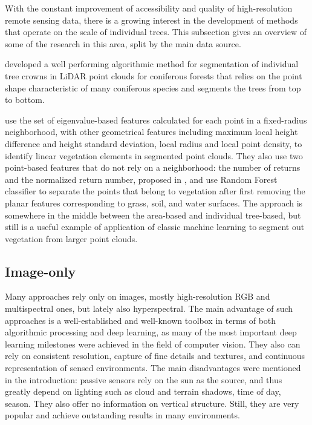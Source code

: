 With the constant improvement of accessibility and quality of high-resolution remote sensing data, there is a growing interest in the development of methods that operate on the scale of individual trees.
This subsection gives an overview of some of the research in this area, split by the main data source.

\citet{liNewMethodSegmenting2012} developed a well performing algorithmic method for segmentation of individual tree crowns in LiDAR point clouds for coniferous forests that relies on the point shape characteristic of many coniferous species and segments the trees from top to bottom.

\citet{lucasIdentificationLinearVegetation2019} use the set of eigenvalue-based features calculated for each point in a fixed-radius neighborhood, with other geometrical features including maximum local height difference and height standard deviation, local radius and local point density, to identify linear vegetation elements in segmented point clouds.
They also use two point-based features that do not rely on a neighborhood: the number of returns and the normalized return number, proposed in \citet{guoRelevanceAirborneLidar2011}, and use Random Forest classifier to separate the points that belong to vegetation after first removing the planar features corresponding to grass, soil, and water surfaces.
The approach is somewhere in the middle between the area-based and individual tree-based, but still is a useful example of application of classic machine learning to segment out vegetation from larger point clouds.

\subsection{Image-only}

Many approaches rely only on images, mostly high-resolution RGB and multispectral ones, but lately also hyperspectral.
The main advantage of such approaches is a well-established and well-known toolbox in terms of both algorithmic processing and deep learning, as many of the most important deep learning milestones were achieved in the field of computer vision.
They also can rely on consistent resolution, capture of fine details and textures, and continuous representation of sensed environments.
The main disadvantages were mentioned in the introduction: passive sensors rely on the sun as the source, and thus greatly depend on lighting such as cloud and terrain shadows, time of day, season.
They also offer no information on vertical structure.
Still, they are very popular and achieve outstanding results in many environments.

